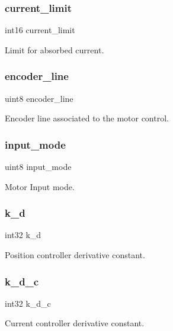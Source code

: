 \subsubsection{current\+\_\+limit}
{\footnotesize\ttfamily int16 current\+\_\+limit}

Limit for absorbed current. \mbox{\label{structst__motor_af1ace45d6367665a8e871afe5617feb1}} 
\subsubsection{encoder\+\_\+line}
{\footnotesize\ttfamily uint8 encoder\+\_\+line}

Encoder line associated to the motor control. \mbox{\label{structst__motor_ae5cc8b2ae06016f1fcf5b2f964618a12}} 
\subsubsection{input\+\_\+mode}
{\footnotesize\ttfamily uint8 input\+\_\+mode}

Motor Input mode. \mbox{\label{structst__motor_ab9d15eaa4612dd1c5597e5634cd1d66c}} 
\subsubsection{k\+\_\+d}
{\footnotesize\ttfamily int32 k\+\_\+d}

Position controller derivative constant. \mbox{\label{structst__motor_af32cf4ebfb30ad068ea530d03ff9a96f}} 
\subsubsection{k\+\_\+d\+\_\+c}
{\footnotesize\ttfamily int32 k\+\_\+d\+\_\+c}

Current controller derivative constant. \mbox{\label{structst__motor_af8bfba55a00d54c9c2a9e4bb11484158}} 
